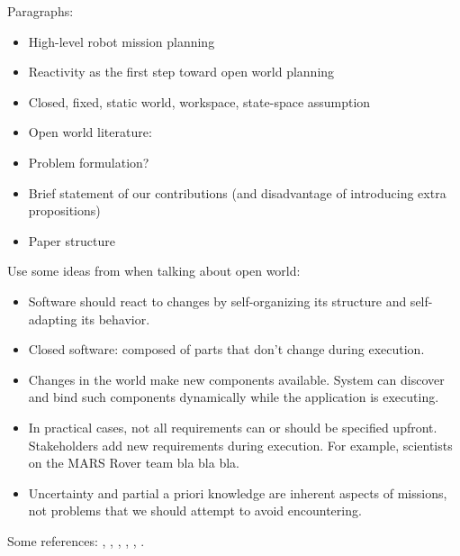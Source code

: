 Paragraphs:
\begin{itemize}
	\item High-level robot mission planning
	\item Reactivity as the first step toward open world planning
  	\item Closed, fixed, static world, workspace, state-space assumption
 	\item Open world literature: \cite{MatthiasAI2010}
	\item Problem formulation?
   	\item Brief statement of our contributions (and disadvantage of introducing extra propositions)
   	\item Paper structure
\end{itemize}

Use some ideas from \cite{open-world-sw} when talking about open world:
\begin{itemize}
	\item Software should react to changes by self-organizing its structure and self-adapting its behavior.
	\item Closed software: composed of parts that don't change during execution.
	\item Changes in the world make new components available. System can discover and bind such components dynamically while the application is executing.
	\item In practical cases, not all requirements can or should be specified upfront. Stakeholders add new requirements during execution. For example, scientists on the MARS Rover team bla bla bla.
	\item Uncertainty and partial a priori knowledge are inherent aspects of missions, not problems that we should attempt to avoid encountering.
\end{itemize}

Some references: \cite{MurrayICRA2012}, \cite{MurrayICRA2013a},  \cite{BeltaICRA2012}, \cite{Dimos2013ICRA}, \cite{Belta2013RSS}, \cite{BingxinRSS2012}.